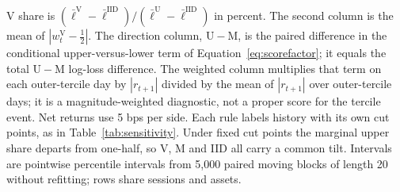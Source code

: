 \begin{table}[!htbp]
\par\smallskip\parbox{0.98\linewidth}{\footnotesize V share is $(\bar\ell^{\mathrm V}-\bar\ell^{\mathrm{IID}})/(\bar\ell^{\mathrm U}-\bar\ell^{\mathrm{IID}})$ in percent. The second column is the mean of $|w^{\mathrm V}_t-\tfrac12|$. The direction column, $\mathrm{U}-\mathrm{M}$, is the paired difference in the conditional upper-versus-lower term of Equation~\eqref{eq:scorefactor}; it equals the total $\mathrm{U}-\mathrm{M}$ log-loss difference. The weighted column multiplies that term on each outer-tercile day by $|r_{t+1}|$ divided by the mean of $|r_{t+1}|$ over outer-tercile days; it is a magnitude-weighted diagnostic, not a proper score for the tercile event. Net returns use 5 bps per side. Each rule labels history with its own cut points, as in Table~\ref{tab:sensitivity}. Under fixed cut points the marginal upper share departs from one-half, so V, M and IID all carry a common tilt. Intervals are pointwise percentile intervals from 5,000 paired moving blocks of length 20 without refitting; rows share sessions and assets.}
\end{table}
